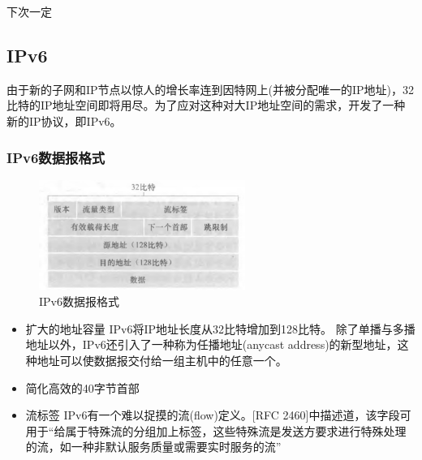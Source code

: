     下次一定

\subsection{IPv6}

    由于新的子网和IP节点以惊人的增长率连到因特网上(并被分配唯一的IP地址)，32比特的IP地址空间即将用尽。为了应对这种对大IP地址空间的需求，开发了一种新的IP协议，即IPv6。

\subsubsection{IPv6数据报格式}

\begin{figure}[!htbp]
    \centering
    \includegraphics[width=0.6\textwidth]{image/chapter04/IPv6数据报格式.png}
    \caption{IPv6数据报格式}
\end{figure}

\begin{itemize}
    \item 扩大的地址容量
    \subitem IPv6将IP地址长度从32比特增加到128比特。
    \subitem 除了单播与多播地址以外，IPv6还引入了一种称为任播地址(anycast address)的新型地址，这种地址可以使数据报交付给一组主机中的任意一个。
    \item 简化高效的40字节首部
    \item 流标签
    \subitem IPv6有一个难以捉摸的流(flow)定义。[RFC 2460]中描述道，该字段可用于“给属于特殊流的分组加上标签，这些特殊流是发送方要求进行特殊处理的流，如一种非默认服务质量或需要实时服务的流”
\end{itemize}

